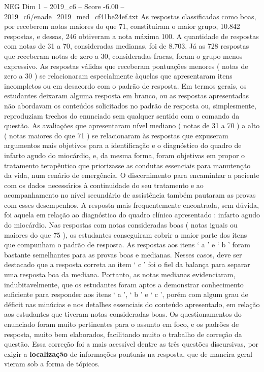 \begin{textsample}{NEG Dim 1 – 2019\_c6 – Score -6.00 – 2019\_c6/enade\_2019\_med\_cf41be24ef.txt}
As respostas classificadas como boas, por receberem notas maiores do que 71, constituíram o maior grupo, 10.842 respostas, e dessas, 246 obtiveram a nota máxima 100.
A quantidade de respostas com notas de 31 a 70, consideradas medianas, foi de 8.703.
Já as 728 respostas que receberam notas de zero a 30, consideradas fracas, foram o grupo menos expressivo.
As respostas válidas que receberam pontuações menores ( notas de zero a 30 ) se relacionaram especialmente àquelas que apresentaram itens incompletos ou em desacordo com o padrão de resposta.
Em termos gerais, os estudantes deixaram alguma resposta em branco, ou as respostas apresentadas não abordavam os conteúdos solicitados no padrão de resposta ou, simplesmente, reproduziam trechos do enunciado sem qualquer sentido com o comando da questão.
As avaliações que apresentaram nível mediano ( notas de 31 a 70 ) a alto ( notas maiores do que 71 ) se relacionaram às respostas que expuseram argumentos mais objetivos para a identificação e o diagnóstico do quadro de infarto agudo do miocárdio, e, da mesma forma, foram objetivas em propor o tratamento terapêutico que priorizasse as condutas essenciais para manutenção da vida, num cenário de emergência.
O discernimento para encaminhar a paciente com os dados necessários à continuidade do seu tratamento e ao acompanhamento no nível secundário de assistência também pautaram as provas com esses desempenhos.
A resposta mais frequentemente encontrada, sem dúvida, foi aquela em relação ao diagnóstico do quadro clínico apresentado : infarto agudo do miocárdio.
Nas respostas com notas consideradas boas ( notas iguais ou maiores do que 75 ), os estudantes conseguiram cobrir a maior parte dos itens que compunham o padrão de resposta.
As respostas aos itens ‘ a ’ e ‘ b ’ foram bastante semelhantes para as provas boas e medianas.
Nesses casos, deve ser destacado que a resposta correta ao item ‘ c ’ foi o fiel da balança para separar uma resposta boa da mediana.
Portanto, as notas medianas evidenciaram, indubitavelmente, que os estudantes foram aptos a demonstrar conhecimento suficiente para responder aos itens ‘ a ’, ‘ b ’ e ‘ c ’, porém com algum grau de déficit nas minúcias e nos detalhes essenciais do conteúdo apresentado, em relação aos estudantes que tiveram notas consideradas boas.
Os questionamentos do enunciado foram muito pertinentes para o assunto em foco, e os padrões de resposta, muito bem elaborados, facilitando muito o trabalho de correção da questão.
Essa correção foi a mais acessível dentre as três questões discursivas, por exigir a \textbf{localização} de informações pontuais na resposta, que de maneira geral vieram sob a forma de tópicos.

\end{textsample}

